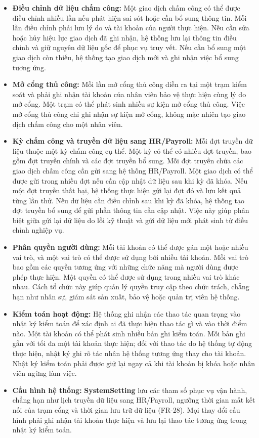 \begin{itemize}
    \item \textbf{Điều chỉnh dữ liệu chấm công:} Một giao dịch chấm công có thể được điều chỉnh nhiều lần nếu phát hiện sai sót hoặc cần bổ sung thông tin. Mỗi lần điều chỉnh phải lưu lý do và tài khoản của người thực hiện. Nếu cần sửa hoặc hủy hiệu lực giao dịch đã ghi nhận, hệ thống lưu lại thông tin điều chỉnh và giữ nguyên dữ liệu gốc để phục vụ truy vết. Nếu cần bổ sung một giao dịch còn thiếu, hệ thống tạo giao dịch mới và ghi nhận việc bổ sung tương ứng.
    \item \textbf{Mở cổng thủ công:} Mỗi lần mở cổng thủ công diễn ra tại một trạm kiểm soát và phải ghi nhận tài khoản của nhân viên bảo vệ thực hiện cùng lý do mở cổng. Một trạm có thể phát sinh nhiều sự kiện mở cổng thủ công. Việc mở cổng thủ công chỉ ghi nhận sự kiện mở cổng, không mặc nhiên tạo giao dịch chấm công cho một nhân viên.
    \item \textbf{Kỳ chấm công và truyền dữ liệu sang HR/Payroll:} Mỗi đợt truyền dữ liệu thuộc một kỳ chấm công cụ thể. Một kỳ có thể có nhiều đợt truyền, bao gồm đợt truyền chính và các đợt truyền bổ sung. Mỗi đợt truyền chứa các giao dịch chấm công cần gửi sang hệ thống HR/Payroll. Một giao dịch có thể được gửi trong nhiều đợt nếu cần cập nhật dữ liệu sau khi kỳ đã khóa. Nếu một đợt truyền thất bại, hệ thống thực hiện gửi lại đợt đó và lưu kết quả từng lần thử. Nếu dữ liệu cần điều chỉnh sau khi kỳ đã khóa, hệ thống tạo đợt truyền bổ sung để gửi phần thông tin cần cập nhật. Việc này giúp phân biệt giữa gửi lại dữ liệu do lỗi kỹ thuật và gửi dữ liệu mới phát sinh từ điều chỉnh nghiệp vụ.
    \item \textbf{Phân quyền người dùng:} Mỗi tài khoản có thể được gán một hoặc nhiều vai trò, và một vai trò có thể được sử dụng bởi nhiều tài khoản. Mỗi vai trò bao gồm các quyền tương ứng với những chức năng mà người dùng được phép thực hiện. Một quyền có thể được sử dụng trong nhiều vai trò khác nhau. Cách tổ chức này giúp quản lý quyền truy cập theo chức trách, chẳng hạn như nhân sự, giám sát sản xuất, bảo vệ hoặc quản trị viên hệ thống.
    \item \textbf{Kiểm toán hoạt động:} Hệ thống ghi nhận các thao tác quan trọng vào nhật ký kiểm toán để xác định ai đã thực hiện thao tác gì và vào thời điểm nào. Một tài khoản có thể phát sinh nhiều bản ghi kiểm toán. Mỗi bản ghi gắn với tối đa một tài khoản thực hiện; đối với thao tác do hệ thống tự động thực hiện, nhật ký ghi rõ tác nhân hệ thống tương ứng thay cho tài khoản. Nhật ký kiểm toán phải được giữ lại ngay cả khi tài khoản bị khóa hoặc nhân viên ngừng làm việc.
    \item \textbf{Cấu hình hệ thống:} \textbf{SystemSetting} lưu các tham số phục vụ vận hành, chẳng hạn như lịch truyền dữ liệu sang HR/Payroll, ngưỡng thời gian mất kết nối của trạm cổng và thời gian lưu trữ dữ liệu (FR-28). Mọi thay đổi cấu hình phải ghi nhận tài khoản thực hiện và lưu lại thao tác tương ứng trong nhật ký kiểm toán.
\end{itemize}

